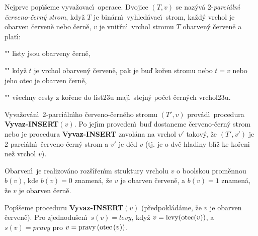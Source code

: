 \flushpar Nejprve pop\'\i\v seme vyva\v zovac\'\i\ operace. 
Dvojice $\left(T,v\right)$ se naz\'yv\'a 2-\emph{parci\'aln\'\i}
\emph{\v cerveno}-\emph{\v cern\'y} \emph{strom}, kdy\v z $T$ je 
bin\'arn\'\i\ vyhled\'avac\'\i\ strom, ka\v zd\'y vrchol je obarven 
\v cerven\v e nebo \v cern\v e, $v$ je 
vnit\v rn\'\i\ vrchol stromu $T$ obarven\'y \v cerven\v e a plat\'\i :
\roster
\item"{}"
listy jsou obarveny \v cern\v e,
\item"{}"
kdy\v z $t$ je vrchol obarven\'y \v cerven\v e, pak je bu\v d ko\v ren 
stromu nebo $t=v$ nebo jeho otec je obarven \v cern\v e,
\item"{}"
v\v sechny cesty z ko\v rene do list\accent23u maj\'\i\ stejn\'y 
po\v cet \v cer\-n\'ych vrchol\accent23u.
\endroster
\medskip

\flushpar Vyva\v zov\'an\'\i\ 2-parci\'aln\'\i ho \v cerveno-\v cern\'eho stromu $\left(T',v\right)$ 
pro\-v\'a\-d\'\i\ procedura {\bf Vyvaz-IN\-SERT$\left(v\right)$}.  Po jej\'\i m 
proveden\'\i\ bu\v d do\-sta\-neme \v cer\-ve\-no-\v cern\'y strom nebo 
je procedura {\bf Vyvaz-IN\-SERT} zavol\'ana na vrchol $
v'$ takov\'y, 
\v ze $\left(T',v'\right)$ je 2-parci\'aln\'\i\ \v cerve\-no-\v cern\'y strom a $
v'$ je d\v ed $v$ 
(tj.  je o dv\v e hladiny bl\'\i\v z ke ko\v reni ne\v z vrchol $
v$). 
\medskip

\flushpar Obarven\'\i\ je realizov\'ano roz\v s\'\i\v ren\'\i m struktury vrcholu $v$ 
o boolskou prom\v ennou $b\left(v\right)$, kde $b\left(v\right)=0$ znamen\'a, \v ze $v$ je obarven 
\v cerven\v e, a $b\left(v\right)=1$ znamen\'a, \v ze $v$ je obarven \v cern\v e.
\medskip

\flushpar Pop\'\i\v seme proceduru {\bf Vyvaz-INSERT$\left(v\right)$} (p\v redpokl\'ad\'ame, \v ze 
$v$ je obarven \v cerven\v e). Pro zjednodu\v sen\'\i\ $s(v)=levy$, kdy\v z $v=\operatorname{levy}(\operatorname{otec}(v))$, a $s(v)=pravy$ pro  
$v=\operatorname{pravy}\left(\operatorname{otec}\left(v\right)\right)$.
\bigskip

